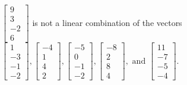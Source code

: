 \begin{exercise}
\begin{exerciseStatement}
  \end{exerciseStatement}
  \begin{exerciseAnswer}
   \(\left[\begin{array}{c}
9 \\
3 \\
-2 \\
6
\end{array}\right]\) 
  	 is not  
	a linear combination of the vectors \(\left[\begin{array}{c}
1 \\
-3 \\
-1 \\
-2
\end{array}\right] , \left[\begin{array}{c}
-4 \\
1 \\
4 \\
2
\end{array}\right] , \left[\begin{array}{c}
-5 \\
0 \\
-1 \\
-2
\end{array}\right] , \left[\begin{array}{c}
-8 \\
2 \\
8 \\
4
\end{array}\right] , \text{ and } \left[\begin{array}{c}
11 \\
-7 \\
-5 \\
-4
\end{array}\right]\).

	
  


  \end{exerciseAnswer}
\end{exercise}